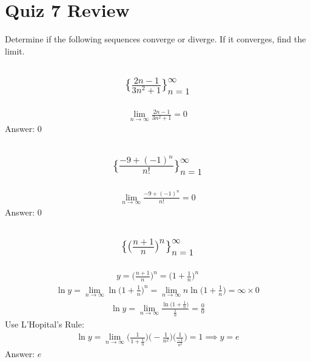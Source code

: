 \documentclass{article}
\begin{document}
\newpage
\section{Quiz 7 Review}
Determine if the following sequences converge or diverge. If it converges, find the limit.
\subsection{
	\begin{align*}
    		\biggl\{ \frac{2n - 1}{3n^2 + 1} \biggl\}_{n = 1}^{\infty}
	\end{align*}
}
\begin{align*}
	\lim_{n \to \infty} {\frac{2n - 1}{3n^2 + 1}} = 0
\end{align*}
Answer: $0$

\subsection{
	\begin{align*}
    		\biggl\{ \frac{-9 + (-1)^n}{n!} \biggl\}_{n = 1}^{\infty}
	\end{align*}
}
\begin{align*}
	\lim_{n \to \infty} {\frac{-9 + (-1)^n}{n!}} = 0
\end{align*}
Answer: $0$

\subsection{
	\begin{align*}
    		\biggl\{ \bigg( \frac{n +1}{n} \bigg)^n \biggl\}_{n = 1}^{\infty}
	\end{align*}
}
\begin{align*}
	y = \bigg( \frac{n +1}{n} \bigg)^n = \bigg( 1 + \frac{1}{n} \bigg)^n
\end{align*}
\begin{align*}
	\ln{y} = \lim_{n \to \infty} {\ln{\bigg( 1 + \frac{1}{n} \bigg)^n}} = \lim_{n \to \infty} {n\ln{\bigg( 1 + \frac{1}{n} \bigg)}} = \infty \times 0
\end{align*}
\begin{align*}
	\ln{y} = \lim_{n \to \infty} \frac{\ln{\bigg( 1 + \frac{1}{n}} \bigg)}{\frac{1}{n}} = \frac{0}{0}
\end{align*}
Use L'Hopital's Rule:
\begin{align*}
	\ln{y} = \lim_{n \to \infty} \bigg( \frac{1}{1 + \frac{1}{n}} \bigg) \bigg(-\frac{1}{n^2} \bigg) \bigg( \frac{1}{\frac{-1}{n^2}} \bigg) = 1 \implies y = e
\end{align*}
Answer: $e$
\end{document}
